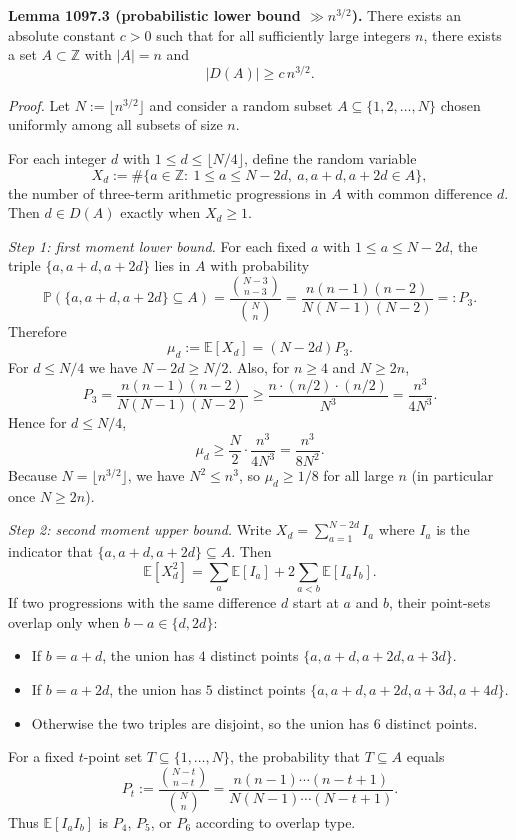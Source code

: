 \smallskip
\noindent\textbf{Lemma 1097.3 (probabilistic lower bound $\gg n^{3/2}$).}
There exists an absolute constant $c>0$ such that for all sufficiently large integers $n$, there exists a set $A\subset\mathbb{Z}$ with $|A|=n$ and
\[
|D(A)|\ge c\,n^{3/2}.
\]

\smallskip
\noindent\emph{Proof.}
Let $N:=\lfloor n^{3/2}\rfloor$ and consider a random subset $A\subseteq\{1,2,\dots,N\}$ chosen uniformly among all subsets of size $n$.

For each integer $d$ with $1\le d\le \lfloor N/4\rfloor$, define the random variable
\[
X_d := \#\{a\in\mathbb{Z}:\ 1\le a\le N-2d,\ a,a+d,a+2d\in A\},
\]
the number of three-term arithmetic progressions in $A$ with common difference $d$.
Then $d\in D(A)$ exactly when $X_d\ge 1$.

\smallskip
\noindent
\emph{Step 1: first moment lower bound.}
For each fixed $a$ with $1\le a\le N-2d$, the triple $\{a,a+d,a+2d\}$ lies in $A$ with probability
\[
\mathbb{P}(\{a,a+d,a+2d\}\subseteq A)=\frac{\binom{N-3}{n-3}}{\binom{N}{n}}=\frac{n(n-1)(n-2)}{N(N-1)(N-2)}=:P_3.
\]
Therefore
\[
\mu_d:=\mathbb{E}[X_d]=(N-2d)P_3.
\]
For $d\le N/4$ we have $N-2d\ge N/2$. Also, for $n\ge 4$ and $N\ge 2n$,
\[
P_3=\frac{n(n-1)(n-2)}{N(N-1)(N-2)}\ge \frac{n\cdot (n/2)\cdot (n/2)}{N^3}=\frac{n^3}{4N^3}.
\]
Hence for $d\le N/4$,
\[
\mu_d\ge \frac{N}{2}\cdot \frac{n^3}{4N^3}=\frac{n^3}{8N^2}.
\]
Because $N=\lfloor n^{3/2}\rfloor$, we have $N^2\le n^3$, so $\mu_d\ge 1/8$ for all large $n$ (in particular once $N\ge 2n$).

\smallskip
\noindent
\emph{Step 2: second moment upper bound.}
Write $X_d=\sum_{a=1}^{N-2d} I_a$ where $I_a$ is the indicator that $\{a,a+d,a+2d\}\subseteq A$.
Then
\[
\mathbb{E}[X_d^2]=\sum_a \mathbb{E}[I_a] + 2\sum_{a<b}\mathbb{E}[I_a I_b].
\]
If two progressions with the same difference $d$ start at $a$ and $b$, their point-sets overlap only when $b-a\in\{d,2d\}$:
\begin{itemize}
\item If $b=a+d$, the union has $4$ distinct points $\{a,a+d,a+2d,a+3d\}$.
\item If $b=a+2d$, the union has $5$ distinct points $\{a,a+d,a+2d,a+3d,a+4d\}$.
\item Otherwise the two triples are disjoint, so the union has $6$ distinct points.
\end{itemize}
For a fixed $t$-point set $T\subseteq\{1,\dots,N\}$, the probability that $T\subseteq A$ equals
\[
P_t:=\frac{\binom{N-t}{n-t}}{\binom{N}{n}}=\frac{n(n-1)\cdots (n-t+1)}{N(N-1)\cdots (N-t+1)}.
\]
Thus $\mathbb{E}[I_a I_b]$ is $P_4$, $P_5$, or $P_6$ according to overlap type.

